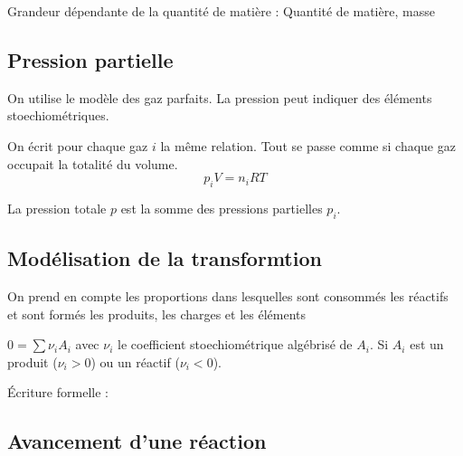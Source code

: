 \documentclass[french]{yLectureNote}
\begin{document}
\begin{definition}
Grandeur dépendante de la quantité de matière :  Quantité de matière, masse
\end{definition}
\subsection{Pression partielle}
On utilise le modèle des gaz parfaits. La pression peut indiquer des éléments stoechiométriques.

\begin{theorem}
On écrit pour chaque gaz $i$ la m\^eme relation. Tout se passe comme si chaque gaz occupait la totalité du volume.
 \[p_iV = n_iRT\]
\end{theorem}
La pression totale $p$ est la somme des pressions partielles $p_i$.



\subsection{Modélisation de la transformtion}
%
%

On prend en compte les proportions dans lesquelles sont consommés les réactifs et sont formés les produits, les charges et les éléments
\begin{definition}
$0 = \sum \nu_i A_i$ avec $\nu_i$ le coefficient stoechiométrique algébrisé de $A_i$. Si $A_i$ est un produit ($\nu_i >0$) ou un réactif ($\nu_i <0$).
\end{definition}
Écriture formelle :

\subsection{Avancement d'une réaction}
\end{document}
